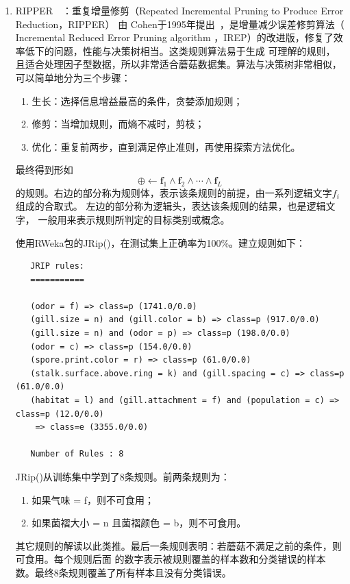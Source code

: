 \documentclass[lang=cn,11pt,a4paper,cite=super]{elegantpaper}
\begin{document}
\begin{enumerate}
   \item RIPPER~\cite{mlwr}~\cite{jripwiki}：重复增量修剪（Repeated Incremental Pruning to Produce Error Reduction，RIPPER）
   由 Cohen于1995年提出~\cite{cohen}，是增量减少误差修剪算法（ Incremental
   Reduced Error Pruning algorithm ，IREP）的改进版，修复了效率低下的问题，性能与决策树相当。这类规则算法易于生成
   可理解的规则，且适合处理因子型数据，所以非常适合蘑菇数据集。算法与决策树非常相似，可以简单地分为三个步骤：
   \begin{enumerate}
      \item 生长：选择信息增益最高的条件，贪婪添加规则；
      \item 修剪：当增加规则，而熵不减时，剪枝；
      \item 优化：重复前两步，直到满足停止准则，再使用探索方法优化。
   \end{enumerate}
最终得到形如$$\oplus \leftarrow \mathbf{f}_{1} \wedge \mathbf{f}_{2} \wedge \cdots \wedge \mathbf{f}_{L}$$
的规则。右边的部分称为规则体，表示该条规则的前提，由一系列逻辑文字$f_i$​组成的合取式。
左边的部分称为逻辑头，表达该条规则的结果，也是逻辑文字， 一般用来表示规则所判定的目标类别或概念。
   \par 使用RWeka包的JRip()，在测试集上正确率为100\%。建立规则如下：
\begin{lstlisting}
   JRIP rules:
   ===========
   
   (odor = f) => class=p (1741.0/0.0)
   (gill.size = n) and (gill.color = b) => class=p (917.0/0.0)
   (gill.size = n) and (odor = p) => class=p (198.0/0.0)
   (odor = c) => class=p (154.0/0.0)
   (spore.print.color = r) => class=p (61.0/0.0)
   (stalk.surface.above.ring = k) and (gill.spacing = c) => class=p (61.0/0.0)
   (habitat = l) and (gill.attachment = f) and (population = c) => class=p (12.0/0.0)
    => class=e (3355.0/0.0)
   
   Number of Rules : 8
\end{lstlisting}
JRip()从训练集中学到了8条规则。前两条规则为：
\begin{enumerate}
   \item 如果气味 = f，则不可食用；
   \item 如果菌褶大小 = n 且菌褶颜色 = b，则不可食用。
\end{enumerate}
其它规则的解读以此类推。最后一条规则表明：若蘑菇不满足之前的条件，则可食用。每个规则后面
的数字表示被规则覆盖的样本数和分类错误的样本数。最终8条规则覆盖了所有样本且没有分类错误。


\end{enumerate}
\end{document}
